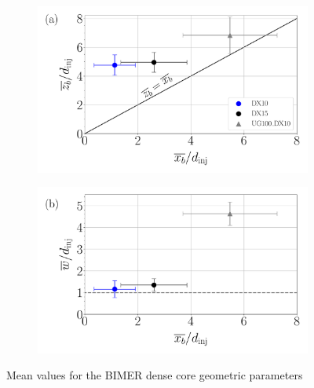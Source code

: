 \begin{figure}[ht]
\flushleft
\begin{subfigure}[b]{0.45\textwidth}
	\centering
   \includegraphics[scale=0.25]{./part3_applications/figures_ch8_resolved/results_dense_core_modeling/map_xb_zb}
   \label{fig:BIMER_dense_core_mean_parameters_scatterplots_zb_xb}
\end{subfigure}
\hspace{0.25in}
\begin{subfigure}[b]{0.45\textwidth}
	\centering
   \includegraphics[scale=0.25]{./part3_applications/figures_ch8_resolved/results_dense_core_modeling/map_xb_width}
   \label{fig:BIMER_dense_core_mean_parameters_scatterplots_w_xb}
\end{subfigure}
   \vspace*{-0.30in}
\caption{Mean values for the BIMER dense core geometric parameters}
\label{fig:BIMER_DC_mean_parameters_scatterplots}
\end{figure}


